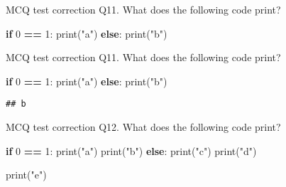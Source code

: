 \documentclass[
  8pt,
  ignorenonframetext,
]{beamer}
\newenvironment{Shaded}{\begin{snugshade}}{\end{snugshade}}
\newcommand{\BuiltInTok}[1]{#1}
\newcommand{\ControlFlowTok}[1]{\textcolor[rgb]{0.13,0.29,0.53}{\textbf{#1}}}
\newcommand{\DecValTok}[1]{\textcolor[rgb]{0.00,0.00,0.81}{#1}}
\newcommand{\NormalTok}[1]{#1}
\newcommand{\OperatorTok}[1]{\textcolor[rgb]{0.81,0.36,0.00}{\textbf{#1}}}
\newcommand{\StringTok}[1]{\textcolor[rgb]{0.31,0.60,0.02}{#1}}
\begin{document}
\begin{frame}[fragile]{MCQ test correction}
\protect\hypertarget{mcq-test-correction-20}{}
Q11. What does the following code print?

\begin{Shaded}
\begin{Highlighting}[]
\ControlFlowTok{if} \DecValTok{0} \OperatorTok{==} \DecValTok{1}\NormalTok{:}
    \BuiltInTok{print}\NormalTok{(}\StringTok{"a"}\NormalTok{)}
\ControlFlowTok{else}\NormalTok{:}
    \BuiltInTok{print}\NormalTok{(}\StringTok{"b"}\NormalTok{)}
\end{Highlighting}
\end{Shaded}
\end{frame}

\begin{frame}[fragile]{MCQ test correction}
\protect\hypertarget{mcq-test-correction-21}{}
Q11. What does the following code print?

\begin{Shaded}
\begin{Highlighting}[]
\ControlFlowTok{if} \DecValTok{0} \OperatorTok{==} \DecValTok{1}\NormalTok{:}
    \BuiltInTok{print}\NormalTok{(}\StringTok{"a"}\NormalTok{)}
\ControlFlowTok{else}\NormalTok{:}
    \BuiltInTok{print}\NormalTok{(}\StringTok{"b"}\NormalTok{)}
\end{Highlighting}
\end{Shaded}

\begin{verbatim}
## b
\end{verbatim}
\end{frame}

\begin{frame}[fragile]{MCQ test correction}
\protect\hypertarget{mcq-test-correction-22}{}
Q12. What does the following code print?

\begin{Shaded}
\begin{Highlighting}[]
\ControlFlowTok{if} \DecValTok{0} \OperatorTok{==} \DecValTok{1}\NormalTok{:}
    \BuiltInTok{print}\NormalTok{(}\StringTok{"a"}\NormalTok{)}
    \BuiltInTok{print}\NormalTok{(}\StringTok{"b"}\NormalTok{)}
\ControlFlowTok{else}\NormalTok{:}
    \BuiltInTok{print}\NormalTok{(}\StringTok{"c"}\NormalTok{)}
    \BuiltInTok{print}\NormalTok{(}\StringTok{"d"}\NormalTok{)}

\BuiltInTok{print}\NormalTok{(}\StringTok{"e"}\NormalTok{)}
\end{Highlighting}
\end{Shaded}
\end{frame}
\end{document}
